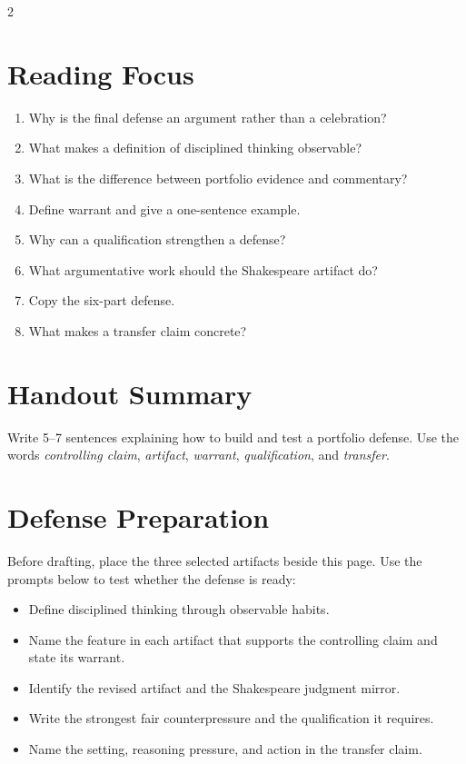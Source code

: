 \documentclass[12pt]{article}
\begin{document}
\begin{multicols}{2}
\section*{Reading Focus}
\begin{enumerate}[leftmargin=*]
\item Why is the final defense an argument rather than a celebration?
\item What makes a definition of disciplined thinking observable?
\item What is the difference between portfolio evidence and commentary?
\item Define warrant and give a one-sentence example.
\item Why can a qualification strengthen a defense?
\item What argumentative work should the Shakespeare artifact do?
\item Copy the six-part defense.
\item What makes a transfer claim concrete?
\end{enumerate}

\section*{Handout Summary}
Write 5--7 sentences explaining how to build and test a portfolio defense. Use the words \textit{controlling claim}, \textit{artifact}, \textit{warrant}, \textit{qualification}, and \textit{transfer}.

\begingroup\small
\section*{Defense Preparation}
Before drafting, place the three selected artifacts beside this page. Use the prompts below to test whether the defense is ready:
\begin{itemize}[leftmargin=*,itemsep=0.05em,topsep=0.1em]
\item Define disciplined thinking through observable habits.
\item Name the feature in each artifact that supports the controlling claim and state its warrant.
\item Identify the revised artifact and the Shakespeare judgment mirror.
\item Write the strongest fair counterpressure and the qualification it requires.
\item Name the setting, reasoning pressure, and action in the transfer claim.
\end{itemize}
\endgroup
\end{multicols}
\end{document}
